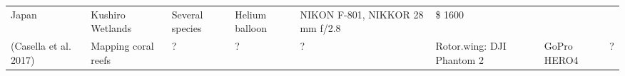 \documentclass[]{interact}
\theoremstyle{plain}%
\theoremstyle{definition}
\theoremstyle{remark}
\begin{document}
\begin{longtable}[]{@{}llllllll@{}}
\begin{minipage}[t]{0.03\columnwidth}
Japan\strut
\end{minipage} & \begin{minipage}[t]{0.14\columnwidth}\raggedright\strut
Kushiro Wetlands\strut
\end{minipage} & \begin{minipage}[t]{0.10\columnwidth}\raggedright\strut
Several species\strut
\end{minipage} & \begin{minipage}[t]{0.09\columnwidth}\raggedright\strut
Helium balloon\strut
\end{minipage} & \begin{minipage}[t]{0.11\columnwidth}\raggedright\strut
NIKON F-801, NIKKOR 28 mm f/2.8\strut
\end{minipage} & \begin{minipage}[t]{0.01\columnwidth}\raggedright\strut
\$ 1600\strut
\end{minipage}\tabularnewline
\begin{minipage}[t]{0.11\columnwidth}\raggedright\strut
(Casella et al. 2017)\strut
\end{minipage} & \begin{minipage}[t]{0.18\columnwidth}\raggedright\strut
Mapping coral reefs\strut
\end{minipage} & \begin{minipage}[t]{0.03\columnwidth}\raggedright\strut
?\strut
\end{minipage} & \begin{minipage}[t]{0.14\columnwidth}\raggedright\strut
?\strut
\end{minipage} & \begin{minipage}[t]{0.10\columnwidth}\raggedright\strut
?\strut
\end{minipage} & \begin{minipage}[t]{0.09\columnwidth}\raggedright\strut
Rotor.wing: DJI Phantom 2\strut
\end{minipage} & \begin{minipage}[t]{0.11\columnwidth}\raggedright\strut
GoPro HERO4\strut
\end{minipage} & \begin{minipage}[t]{0.01\columnwidth}\raggedright\strut
?\strut
\end{minipage}\tabularnewline
\bottomrule
\end{longtable}
\end{document}
